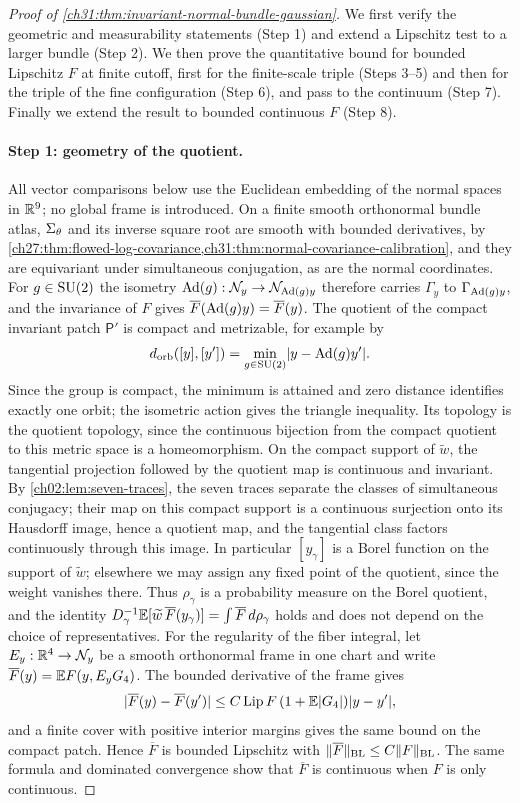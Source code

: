\begin{proof}[Proof of \cref{ch31:thm:invariant-normal-bundle-gaussian}]
We first verify the geometric and measurability statements (Step 1) and extend a Lipschitz test to a larger bundle (Step 2). We then prove the quantitative bound for bounded Lipschitz $F$ at finite cutoff, first for the finite-scale triple (Steps 3--5) and then for the triple of the fine configuration (Step 6), and pass to the continuum (Step 7). Finally we extend the result to bounded continuous $F$ (Step 8).

\paragraph{Step 1: geometry of the quotient.}
All vector comparisons below use the Euclidean embedding of the normal spaces in $\mathbb R^9$; no global frame is introduced. On a finite smooth orthonormal bundle atlas, $\Sigma_\theta$ and its inverse square root are smooth with bounded derivatives, by \cref{ch27:thm:flowed-log-covariance,ch31:thm:normal-covariance-calibration}, and they are equivariant under simultaneous conjugation, as are the normal coordinates. For $g\in\mathrm{SU}(2)$ the isometry $\operatorname{Ad}(g):\mathcal N_{y}\to\mathcal N_{\operatorname{Ad}(g)y}$ therefore carries $\Gamma_y$ to $\Gamma_{\operatorname{Ad}(g)y}$, and the invariance of $F$ gives $\overline F(\operatorname{Ad}(g)y)=\overline F(y)$. The quotient of the compact invariant patch $\mathsf P'$ is compact and metrizable, for example by
\[
 d_{\rm orb}([y],[y'])=\min_{g\in\mathrm{SU}(2)}\lvert y-\operatorname{Ad}(g)y'\rvert.
\]
Since the group is compact, the minimum is attained and zero distance identifies exactly one orbit; the isometric action gives the triangle inequality. Its topology is the quotient topology, since the continuous bijection from the compact quotient to this metric space is a homeomorphism. On the compact support of $\widetilde w$, the tangential projection followed by the quotient map is continuous and invariant. By \cref{ch02:lem:seven-traces}, the seven traces separate the classes of simultaneous conjugacy; their map on this compact support is a continuous surjection onto its Hausdorff image, hence a quotient map, and the tangential class factors continuously through this image. In particular $[y_\gamma]$ is a Borel function on the support of $\widetilde w$; elsewhere we may assign any fixed point of the quotient, since the weight vanishes there. Thus $\rho_\gamma$ is a probability measure on the Borel quotient, and the identity $D_\gamma^{-1}\mathbb E[\widetilde w\,\overline F(y_\gamma)]=\int\overline F\,d\rho_\gamma$ holds and does not depend on the choice of representatives. For the regularity of the fiber integral, let $E_y:\mathbb R^4\to\mathcal N_{y}$ be a smooth orthonormal frame in one chart and write $\overline F(y)=\mathbb E F(y,E_yG_4)$. The bounded derivative of the frame gives
\[
 \lvert \overline F(y)-\overline F(y')\rvert\le C\operatorname{Lip} F\,(1+\mathbb E\lvert G_4\rvert)\lvert y-y'\rvert,
\]
and a finite cover with positive interior margins gives the same bound on the compact patch. Hence $\overline F$ is bounded Lipschitz with $\lVert \overline F\rVert_{\rm BL}\le C\lVert F\rVert_{\rm BL}$. The same formula and dominated convergence show that $\overline F$ is continuous when $F$ is only continuous.


\end{proof}

